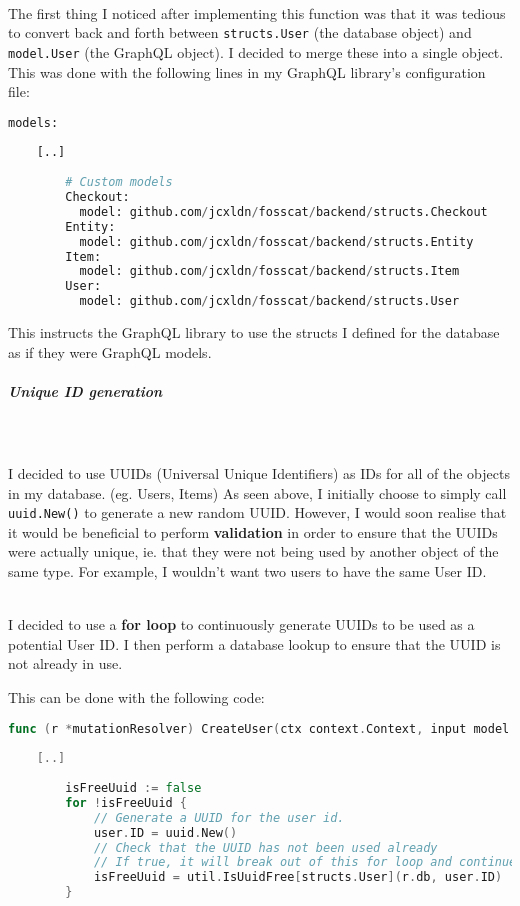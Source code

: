 \documentclass[../../main.tex]{subfiles}
\begin{document}
\noindent \\ The first thing I noticed after implementing this function was that it was tedious to convert back and forth between \lstinline{structs.User} (the database object) and \lstinline{model.User} (the GraphQL object). I decided to merge these into a single object. This was done with the following lines in my GraphQL library's configuration file:

\begin{lstlisting}[language=Python]
    models:
    
    [..]
    
        # Custom models
        Checkout:
          model: github.com/jcxldn/fosscat/backend/structs.Checkout
        Entity:
          model: github.com/jcxldn/fosscat/backend/structs.Entity
        Item:
          model: github.com/jcxldn/fosscat/backend/structs.Item
        User:
          model: github.com/jcxldn/fosscat/backend/structs.User
    \end{lstlisting}

This instructs the GraphQL library to use the structs I defined for the database as if they were GraphQL models.

\subparagraph{Unique ID generation}

\noindent \\\\ I decided to use UUIDs (Universal Unique Identifiers) as IDs for all of the objects in my database. (eg. Users, Items) As seen above, I initially choose to simply call \lstinline{uuid.New()} to generate a new random UUID. However, I would soon realise that it would be beneficial to perform \textbf{validation} in order to ensure that the UUIDs were actually unique, ie. that they were not being used by another object of the same type. For example, I wouldn't want two users to have the same User ID.

\noindent \\ I decided to use a \textbf{for loop} to continuously generate UUIDs to be used as a potential User ID. I then perform a database lookup to ensure that the UUID is not already in use.

This can be done with the following code:

\begin{lstlisting}[language=Go]
    func (r *mutationResolver) CreateUser(ctx context.Context, input model.NewUser) (*structs.User, error) {
    
    [..]
    
        isFreeUuid := false
        for !isFreeUuid {
            // Generate a UUID for the user id.
            user.ID = uuid.New()
            // Check that the UUID has not been used already
            // If true, it will break out of this for loop and continue.
            isFreeUuid = util.IsUuidFree[structs.User](r.db, user.ID)
        }
    
    \end{lstlisting}
\end{document}
